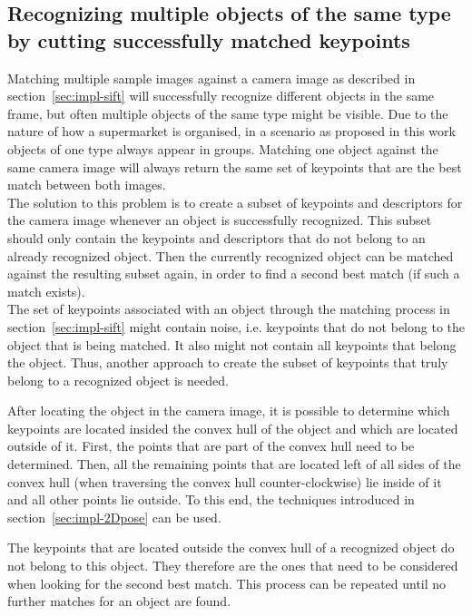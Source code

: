 \subsection{Recognizing multiple objects of the same type by cutting successfully matched keypoints}
\label{sec:impl-multiple}
Matching multiple sample images against a camera image as described in section~\ref{sec:impl-sift} will successfully recognize different objects in the same frame, but often multiple objects of the same type might be visible. Due to the nature of how a supermarket is organised, in a scenario as proposed in this work objects of one type always appear in groups. Matching one object against the same camera image will always return the same set of keypoints that are the best match between both images. \\

The solution to this problem is to create a subset of keypoints and descriptors for the camera image whenever an object is successfully recognized. This subset should only contain the keypoints and descriptors that do not belong to an already recognized object. Then the currently recognized object can be matched against the resulting subset again, in order to find a second best match (if such a match exists). \\

The set of keypoints associated with an object through the matching process in section~\ref{sec:impl-sift} might contain noise, i.e. keypoints that do not belong to the object that is being matched. It also might not contain all keypoints that belong the object. Thus, another approach to create the subset of keypoints that truly belong to a recognized object is needed.

After locating the object in the camera image, it is possible to determine which keypoints are located insided the convex hull of the object and which are located outside of it. First, the points that are part of the convex hull need to be determined. Then, all the remaining points that are located left of all sides of the convex hull (when traversing the convex hull counter-clockwise) lie inside of it and all other points lie outside. To this end, the techniques introduced in section~\ref{sec:impl-2Dpose} can be used.

The keypoints that are located outside the convex hull of a recognized object do not belong to this object. They therefore are the ones that need to be considered when looking for the second best match. This process can be repeated until no further matches for an object are found. \\

